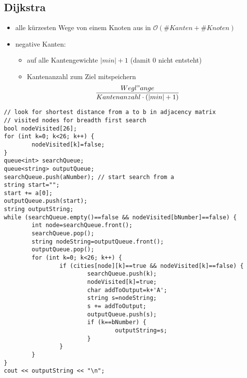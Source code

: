 \documentclass[10pt,a4paper,ngerman,oneside,
]{article}
\begin{document}
\subsection{Dijkstra}
		
			\begin{itemize}
				\item alle kürzesten Wege von einem Knoten aus in $\mathcal{O}(\#Kanten+\#Knoten)$
				\item negative Kanten: 
				\begin{itemize}
					\item auf alle Kantengewichte $|min|+1$ (damit 0 nicht entsteht)
					\item Kantenanzahl zum Ziel mitspeichern
					\begin{equation*}
						\frac{Wegl"ange}{Kantenanzahl \cdot (|min|+1)}
					\end{equation*}
				\end{itemize}
			\end{itemize}
				\lstset{language=c}
				\begin{lstlisting}
// look for shortest distance from a to b in adjacency matrix
// visited nodes for breadth first search
bool nodeVisited[26];
for (int k=0; k<26; k++) {
        nodeVisited[k]=false;
}
queue<int> searchQueue;
queue<string> outputQueue;
searchQueue.push(aNumber); // start search from a
string start="";
start += a[0];
outputQueue.push(start);
string outputString;
while (searchQueue.empty()==false && nodeVisited[bNumber]==false) {
        int node=searchQueue.front();
        searchQueue.pop();
        string nodeString=outputQueue.front();
        outputQueue.pop();
        for (int k=0; k<26; k++) {
                if (cities[node][k]==true && nodeVisited[k]==false) {
                        searchQueue.push(k);
                        nodeVisited[k]=true;
                        char addToOutput=k+'A';
                        string s=nodeString;
                        s += addToOutput;
                        outputQueue.push(s);
                        if (k==bNumber) {
                                outputString=s;
                        }
                }
        }
}
cout << outputString << "\n";	
\end{lstlisting}
\end{document}

